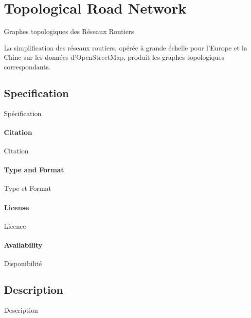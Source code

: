 \section{Topological Road Network}{Graphes topologiques des Réseaux Routiers}

La simplification des réseaux routiers, opérée à grande échelle pour l'Europe et la Chine sur les données d'OpenStreetMap, produit les graphes topologiques correspondants. 


\subsection{Specification}{Spécification}

\paragraph{Citation}{Citation}

\paragraph{Type and Format}{Type et Format}

\paragraph{License}{Licence}

\paragraph{Availability}{Disponibilité}



\subsection{Description}{Description}










